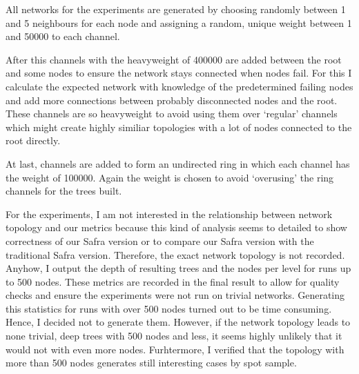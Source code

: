   All networks for the experiments are generated by choosing randomly between 1 and 5 neighbours for each node and assigning a random, unique weight between 1 and 50000 to each channel.
  
  After this channels with the heavyweight of 400000 are added between the root and some nodes to ensure the network stays connected when nodes fail.
  For this I calculate the expected network with knowledge of the predetermined failing nodes and add more connections between probably disconnected nodes and the root.
  These channels are so heavyweight to avoid using them over `regular' channels which might create highly similiar topologies with a lot of nodes connected to the root directly.
  
  At last, channels are added to form an undirected ring in which each channel has the weight of 100000. 
  Again the weight is chosen to avoid `overusing' the ring channels for the trees built.
  
  For the experiments, I am not interested in the relationship between network topology and our metrics because this kind of analysis seems to detailed to show correctness of our Safra version or to compare
  our Safra version with the traditional Safra version.
  Therefore, the exact network topology is not recorded. 
  Anyhow, I output the depth of resulting trees and the nodes per level for runs up to 500 nodes.
  These metrics are recorded in the final result to allow for quality checks and ensure the experiments were not run on trivial networks.
  Generating this statistics for runs with over 500 nodes turned out to be time consuming.
  Hence, I decided not to generate them.
  However, if the network topology leads to none trivial, deep trees with 500 nodes and less, it seems highly unlikely that it would not with even more nodes.
  Furhtermore, I verified that the topology with more than 500 nodes generates still interesting cases by spot sample.
  